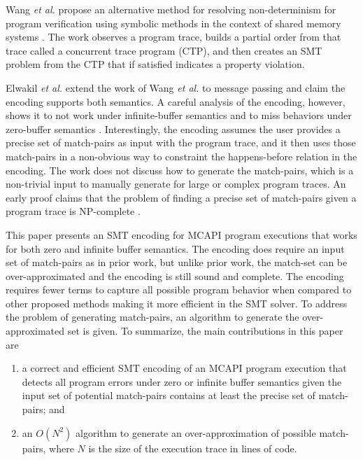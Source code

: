 Wang \textit{et al.} propose an alternative method for resolving
non-determinism for program verification using symbolic methods in the context
of shared memory systems \cite{wang:fse09}. The work observes a
program trace, builds a partial order from that trace called a
concurrent trace program (CTP), and then creates an SMT problem from
the CTP that if satisfied indicates a property violation. 

Elwakil \textit{et al.} extend the work of Wang \textit{et al.} to
message passing and claim the encoding supports both semantics. A
careful analysis of the encoding, however, shows it to not work under
infinite-buffer semantics and to miss behaviors under zero-buffer
semantics \cite{elwakil:padtad10}. Interestingly, the encoding assumes
the user provides a precise set of match-pairs as input with the
program trace, and it then uses those match-pairs in a non-obvious way
to constraint the happens-before relation in the encoding. The work
does not discuss how to generate the match-pairs, which is a
non-trivial input to manually generate for large or complex program
traces. An early proof claims that the problem of finding a precise
set of match-pairs given a program trace is NP-complete
\cite{match-pair-np-complete}.

\examplefigone

 This paper presents an SMT encoding for MCAPI program executions that
 works for both zero and infinite buffer semantics. The encoding does
 require an input set of match-pairs as in prior work, but unlike
 prior work, the match-set can be over-approximated and the encoding
 is still sound and complete. The encoding requires fewer terms to
 capture all possible program behavior when compared to other proposed
 methods making it more efficient in the SMT solver.  To address the
 problem of generating match-pairs, an algorithm to generate the
 over-approximated set is given. To summarize, the main contributions
 in this paper are

\begin{enumerate}
\item a correct and efficient SMT encoding of an MCAPI program
  execution that detects all program errors under zero or infinite
  buffer semantics given the input set of potential match-pairs
  contains at least the precise set of match-pairs; and
\item an $O(N^2)$ algorithm to generate an over-approximation of
  possible match-pairs, where $N$ is the size of the execution trace
  in lines of code.
\end{enumerate}

